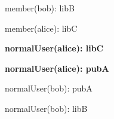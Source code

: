 \documentclass{article}
\begin{document}
{\begin{minipage}{\tableWidth}
\begin{description}[align=left,leftmargin=1em,noitemsep,labelsep=\parindent]
\item{{member(\allowbreak{}bob): libB}}
\item{{member(\allowbreak{}alice): libC}}
\item\textbf{{normalUser(\allowbreak{}alice): libC}}
\item\textbf{{normalUser(\allowbreak{}alice): pubA}}
\item{{normalUser(\allowbreak{}bob): pubA}}
\item{{normalUser(\allowbreak{}bob): libB}}
\end{description}\end{minipage}}
\end{document}
